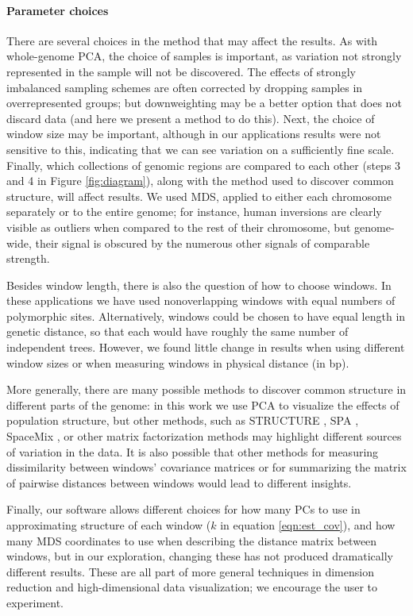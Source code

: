 \documentclass[11pt, oneside]{article}   	%
\begin{document}
\paragraph{Parameter choices}
There are several choices in the method that may affect the results.
As with whole-genome PCA,
the choice of samples is important,
as variation not strongly represented in the sample will not be discovered.
The effects of strongly imbalanced sampling schemes are often corrected by dropping samples in overrepresented groups;
but downweighting may be a better option that does not discard data
(and here we present a method to do this).
Next, the choice of window size may be important,
although in our applications results were not sensitive to this,
indicating that we can see variation on a sufficiently fine scale.
Finally, which collections of genomic regions are compared to each other (steps 3 and 4 in Figure \ref{fig:diagram}),
along with the method used to discover common structure,
will affect results.
We used MDS, applied to either each chromosome separately or to the entire genome;
for instance, human inversions are clearly visible as outliers when compared to the rest of their chromosome,
but genome-wide, their signal is obscured by the numerous other signals of comparable strength.

Besides window length, there is also the question of how to choose windows.
In these applications we have used nonoverlapping windows with equal numbers of polymorphic sites.
Alternatively, windows could be chosen to have equal length in genetic distance,
so that each would have roughly the same number of independent trees.
However, we found little change in results when using different window sizes
or when measuring windows in physical distance (in bp).

More generally, there are many possible methods to discover common structure in different parts of the genome:
in this work we use PCA to visualize the effects of population structure,
but other methods, such as STRUCTURE \citep{falush2003inference},
SPA \citep{yang2012modelbased},
SpaceMix \citep{bradburd2015spatial},
or other matrix factorization methods \citep{engelhardt2010analysis}
may highlight different sources of variation in the data.
It is also possible that other methods for measuring dissimilarity between windows' covariance matrices
or for summarizing the matrix of pairwise distances between windows
would lead to different insights.

Finally, our software allows different choices for how many PCs to use in approximating structure of each window ($k$ in equation \ref{eqn:est_cov}),
and how many MDS coordinates to use when describing the distance matrix between windows,
but in our exploration, changing these has not produced dramatically different results.
These are all part of more general techniques in dimension reduction and high-dimensional data visualization;
we encourage the user to experiment.
\end{document}
